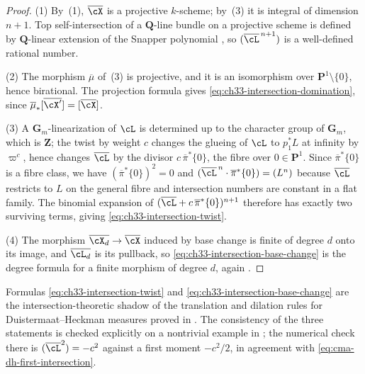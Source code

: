 \begin{proof}
(1)  By \,(1), $\overline\cX$ is a
projective $k$-scheme; by
\,(3) it is integral of dimension
$n+1$.  Top self-intersection of a $\mathbf Q$-line bundle on a
projective scheme is defined by $\mathbf Q$-linear extension of the
Snapper polynomial \cite[Ch.~2]{Ful}, so $(\overline\cL^{\,n+1})$ is a
well-defined rational number.

(2)  The morphism $\overline\mu$ of
\,(3) is projective, and it is an
isomorphism over $\mathbf P^1\setminus\{0\}$, hence birational.  The
projection formula  gives
\eqref{eq:ch33-intersection-domination}, since
$\overline\mu_\ast[\overline{\cX'}]=[\overline\cX]$.

(3)  A $\mathbf G_m$-linearization of $\cL$ is determined up to the
character group of $\mathbf G_m$, which is $\mathbf Z$; the twist by
weight $c$ changes the glueing of $\cL$ to $p_1^\ast L$ at infinity by
$\varpi^{c}$, hence changes $\overline\cL$ by the divisor
$c\,\overline\pi^\ast\{0\}$, the fibre over $0\in\mathbf P^1$.  Since
$\overline\pi^\ast\{0\}$ is a fibre class, we have
$(\overline\pi^\ast\{0\})^2=0$ and
$(\overline\cL^{\,n}\cdot\overline\pi^\ast\{0\})=(L^n)$ because
$\overline\cL$ restricts to $L$ on the general fibre and intersection
numbers are constant in a flat family.  The binomial expansion of
$(\overline\cL+c\,\overline\pi^\ast\{0\})^{n+1}$ therefore has exactly two
surviving terms, giving \eqref{eq:ch33-intersection-twist}.

(4)  The morphism $\overline{\cX_d}\to\overline\cX$ induced by base change
is finite of degree $d$ onto its image, and
$\overline{\cL_d}$ is its pullback, so
\eqref{eq:ch33-intersection-base-change} is the degree formula for a finite
morphism of degree $d$, again .
\end{proof}

\begin{remark}
\label{rem:ch33-two-unit-tests}
Formulas \eqref{eq:ch33-intersection-twist} and
\eqref{eq:ch33-intersection-base-change} are the intersection-theoretic
shadow of the translation and dilation rules for Duistermaat--Heckman
measures proved in .  The consistency of
the three statements is checked explicitly on a nontrivial example in
; the numerical check there is
$(\overline\cL^{2})=-c^2$ against a first moment $-c^2/2$, in agreement
with \eqref{eq:cma-dh-first-intersection}.
\end{remark}

